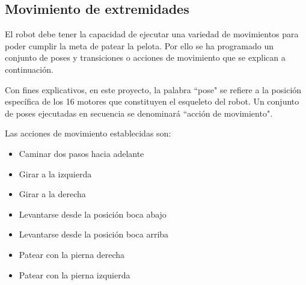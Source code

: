 

\subsection{Movimiento de extremidades}\label{esqueleto}

El robot debe tener la capacidad de ejecutar una variedad de movimientos para poder cumplir la meta de patear la pelota. Por ello se ha programado un conjunto de poses y transiciones o acciones de movimiento que se explican a continuación.

Con fines explicativos, en este proyecto, la palabra ``pose" se refiere a la posición específica de los 16 motores que constituyen el esqueleto del robot. Un conjunto de poses ejecutadas en secuencia se denominará ``acción de movimiento".

Las acciones de movimiento establecidas son:

\begin{itemize}
 \item {Caminar dos pasos hacia adelante}
 \item {Girar a la izquierda}
 \item {Girar a la derecha}
 \item {Levantarse desde la posición boca abajo}
 \item {Levantarse desde la posición boca arriba}
 \item {Patear con la pierna derecha }
 \item {Patear con la pierna izquierda}
 
\end{itemize}

